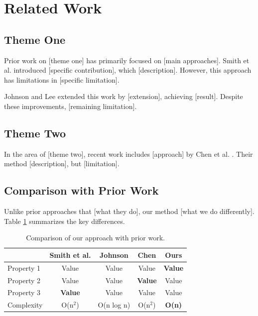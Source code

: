 \section{Related Work}
\label{sec:related}


\subsection{Theme One}
Prior work on [theme one] has primarily focused on [main approaches].
Smith et al. \cite{smith2020} introduced [specific contribution], which [description].
However, this approach has limitations in [specific limitation].

Johnson and Lee \cite{johnson2019} extended this work by [extension], achieving [result].
Despite these improvements, [remaining limitation].

\subsection{Theme Two}
In the area of [theme two], recent work includes [approach] by Chen et al. \cite{chen2021}.
Their method [description], but [limitation].

\subsection{Comparison with Prior Work}
Unlike prior approaches that [what they do], our method [what we do differently].
Table \ref{tab:comparison} summarizes the key differences.

\begin{table}[t]
\centering
\caption{Comparison of our approach with prior work.}
\label{tab:comparison}
\begin{tabular}{lcccc}
\toprule
& Smith et al. \cite{smith2020} & Johnson \cite{johnson2019} & Chen \cite{chen2021} & Ours \\
\midrule
Property 1 & Value & Value & Value & \textbf{Value} \\
Property 2 & Value & Value & \textbf{Value} & Value \\
Property 3 & \textbf{Value} & Value & Value & Value \\
Complexity & O(n$^2$) & O(n log n) & O(n$^2$) & \textbf{O(n)} \\
\bottomrule
\end{tabular}
\end{table}
